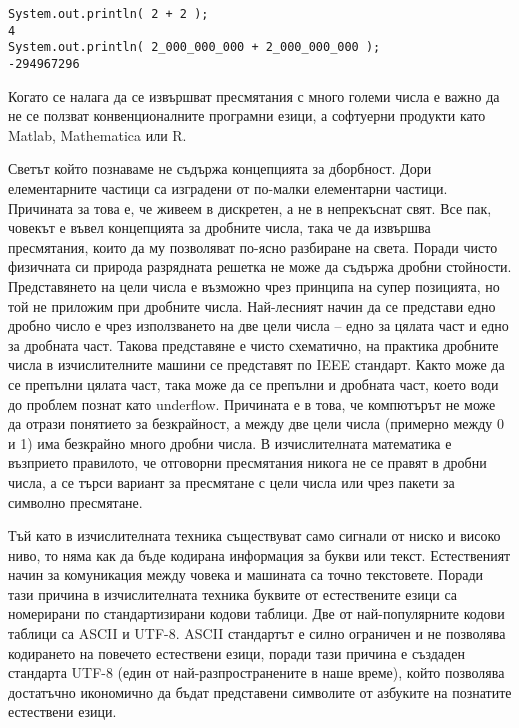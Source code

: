\begin{lstlisting}[caption=Грешка от препълване при събиране, label=listing0015]
System.out.println( 2 + 2 );
4
System.out.println( 2_000_000_000 + 2_000_000_000 );
-294967296
\end{lstlisting}

Когато се налага да се извършват пресмятания с много големи числа е важно да не се ползват конвенционалните програмни езици, а софтуерни продукти като Matlab, Mathematica или R. 

Светът който познаваме не съдържа концепцията за дборбност. Дори елементарните частици са изградени от по-малки елементарни частици. Причината за това е, че живеем в дискретен, а не в непрекъснат свят. Все пак, човекът е въвел концепцията за дробните числа, така че да извършва пресмятания, които да му позволяват по-ясно разбиране на света. Поради чисто физичната си природа разрядната решетка не може да съдържа дробни стойности. Представянето на цели числа е възможно чрез принципа на супер позицията, но той не приложим при дробните числа. Най-лесният начин да се представи едно дробно число е чрез използването на две цели числа – едно за цялата част и едно за дробната част. Такова представяне е чисто схематично, на практика дробните числа в изчислителните машини се представят по IEEE стандарт. Както може да се препълни цялата част, така може да се препълни и дробната част, което води до проблем познат като underflow. Причината е в това, че компютърът не може да отрази понятието за безкрайност, а между две цели числа (примерно между 0 и 1) има безкрайно много дробни числа. В изчислителната математика е възприето правилото, че отговорни пресмятания никога не се правят в дробни числа, а се търси вариант за пресмятане с цели числа или чрез пакети за символно пресмятане. 

Тъй като в изчислителната техника съществуват само сигнали от ниско и високо ниво, то няма как да бъде кодирана информация за букви или текст. Естественият начин за комуникация между човека и машината са точно текстовете. Поради тази причина в изчислителната техника буквите от естествените езици са номерирани по стандартизирани кодови таблици. Две от най-популярните кодови таблици са ASCII и UTF-8. ASCII стандартът е силно ограничен и не позволява кодирането на повечето естествени езици, поради тази причина е създаден стандарта UTF-8 (един от най-разпространените в наше време), който позволява достатъчно икономично да бъдат представени символите от азбуките на познатите естествени езици. 

